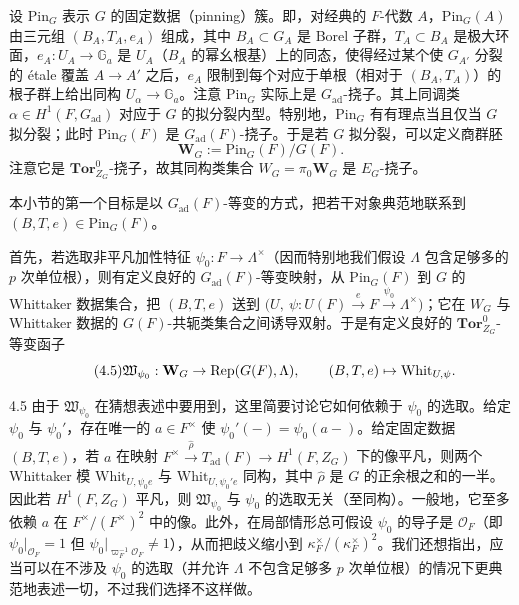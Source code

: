 设 $\mathrm{Pin}_G$ 表示 $G$ 的固定数据（pinning）簇。即，对经典的 $F$-代数 $A$，$\mathrm{Pin}_G(A)$ 由三元组 $(B_A,T_A,e_A)$ 组成，其中 $B_A\subset G_A$ 是 Borel 子群，$T_A\subset B_A$ 是极大环面，$e_A:U_A\to\mathbb{G}_a$ 是 $U_A$（$B_A$ 的幂幺根基）上的同态，使得经过某个使 $G_{A'}$ 分裂的 étale 覆盖 $A\to A'$ 之后，$e_A$ 限制到每个对应于单根（相对于 $(B_A,T_A)$）的根子群上给出同构 $U_\alpha\to\mathbb{G}_a$。注意 $\mathrm{Pin}_G$ 实际上是 $G_{\mathrm{ad}}$-挠子。其上同调类 $\alpha\in H^1(F,G_{\mathrm{ad}})$ 对应于 $G$ 的拟分裂内型。特别地，$\mathrm{Pin}_G$ 有有理点当且仅当 $G$ 拟分裂；此时 $\mathrm{Pin}_G(F)$ 是 $G_{\mathrm{ad}}(F)$-挠子。于是若 $G$ 拟分裂，可以定义商群胚
\begin{equation}
\tag{4.4}
\mathbf{W}_G:=\mathrm{Pin}_G(F)/G(F).
\end{equation}
注意它是 $\mathbf{Tor}^0_{Z_G}$-挠子，故其同构类集合 $W_G=\pi_0\mathbf{W}_G$ 是 $E_G$-挠子。

本小节的第一个目标是以 $G_{\mathrm{ad}}(F)$-等变的方式，把若干对象典范地联系到 $(B,T,e)\in\mathrm{Pin}_G(F)$。

首先，若选取非平凡加性特征 $\psi_0:F\to\Lambda^\times$（因而特别地我们假设 $\Lambda$ 包含足够多的 $p$ 次单位根），则有定义良好的 $G_{\mathrm{ad}}(F)$-等变映射，从 $\mathrm{Pin}_G(F)$ 到 $G$ 的 Whittaker 数据集合，把 $(B,T,e)$ 送到
$\big(U,\ \psi:U(F)\xrightarrow{e}F\xrightarrow{\psi_0}\Lambda^\times\big)$；它在 $W_G$ 与 Whittaker 数据的 $G(F)$-共轭类集合之间诱导双射。于是有定义良好的 $\mathbf{Tor}^0_{Z_G}$-等变函子
\begin{equation}
\tag{4.5}
\mathfrak{W}_{\psi_0}:\mathbf{W}_G\to\operatorname{Rep}(G(F),\Lambda),\qquad (B,T,e)\mapsto\mathrm{Whit}_{U,\psi}.
\end{equation}

\begin{rem}{4.5}
由于 $\mathfrak{W}_{\psi_0}$ 在猜想表述中要用到，这里简要讨论它如何依赖于 $\psi_0$ 的选取。给定 $\psi_0$ 与 $\psi_0'$，存在唯一的 $a\in F^\times$ 使 $\psi_0'(-)=\psi_0(a-)$。给定固定数据 $(B,T,e)$，若 $a$ 在映射 $F^\times\xrightarrow{\hat\rho}T_{\mathrm{ad}}(F)\to H^1(F,Z_G)$ 下的像平凡，则两个 Whittaker 模 $\mathrm{Whit}_{U,\psi_0e}$ 与 $\mathrm{Whit}_{U,\psi_0'e}$ 同构，其中 $\hat\rho$ 是 $G$ 的正余根之和的一半。因此若 $H^1(F,Z_G)$ 平凡，则 $\mathfrak{W}_{\psi_0}$ 与 $\psi_0$ 的选取无关（至同构）。一般地，它至多依赖 $a$ 在 $F^\times/(F^\times)^2$ 中的像。此外，在局部情形总可假设 $\psi_0$ 的导子是 $\mathcal{O}_F$（即 $\psi_0|_{\mathcal{O}_F}=1$ 但 $\psi_0|_{\varpi_F^{-1}\mathcal{O}_F}\neq1$），从而把歧义缩小到 $\kappa_F^\times/(\kappa_F^\times)^2$。我们还想指出，应当可以在不涉及 $\psi_0$ 的选取（并允许 $\Lambda$ 不包含足够多 $p$ 次单位根）的情况下更典范地表述一切，不过我们选择不这样做。
\end{rem}

